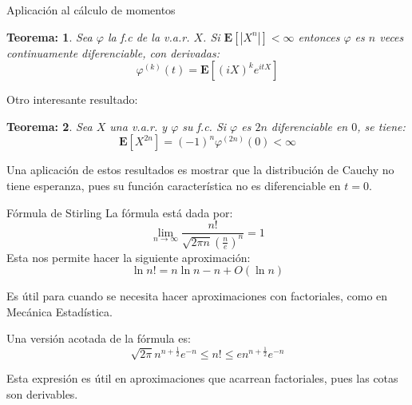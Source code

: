 \documentclass{beamer}
\newcommand{\vp}{\varphi}
\newcommand{\E}{\mathbf{E}}
\newtheorem{teo}{Teorema:}
\begin{document}
\begin{frame}{Aplicación al cálculo de momentos}
	\begin{teo}
		Sea $\vp$ la f.c de la v.a.r. $X$. Si $\E[ |X^{n}|] <\infty $ entonces $\vp$ es $n$ veces continuamente diferenciable, con derivadas: 
		\begin{equation*}
		\vp ^{(k)} (t) = \E [ (iX)^{k} e^{itX} ]
		\end{equation*}
	\end{teo}

Otro interesante resultado: 

	\begin{teo}
	Sea $X$ una v.a.r. y $\vp$ su f.c. Si $\vp$ es $2n$ diferenciable en $0$, se tiene:$$ \E[X^{2n}] = (-1)^{n} \vp ^{(2n)} (0) < \infty $$
\end{teo}

Una aplicación de estos resultados es mostrar que la distribución de Cauchy no tiene esperanza, pues su función característica no es diferenciable en $t=0$.
\end{frame}	
	
	
\begin{frame}{Fórmula de Stirling}
	La fórmula está dada por:
	$$ \lim\limits_{n \rightarrow \infty} \frac{n!}{\sqrt{2 \pi n} \left( \frac{n}{e} \right)^{n} } =1 $$
	Esta nos permite hacer la siguiente aproximación:
	$$ \ln n! = n\ln n -n  +O (\ln n) $$
	
	Es útil para cuando se necesita hacer aproximaciones con factoriales, como en Mecánica Estadística. 
	
	
	Una versión acotada de la fórmula es:
	$$ \sqrt{2 \pi} n^{n +\frac{1}{2}} e ^{-n}\leq n!  \leq e n^{n +\frac{1}{2}} e ^{-n}$$
	
	Esta expresión es útil en aproximaciones que acarrean factoriales, pues las cotas son derivables.
\end{frame}	
\end{document}
